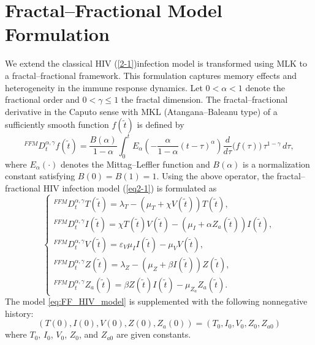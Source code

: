 \documentclass{article}
\theoremstyle{plain}
\theoremstyle{definition}
\numberwithin{equation}{section}
\begin{document}
\section{Fractal--Fractional Model Formulation}\label{sec4}
We extend the classical HIV (\ref{2-1})infection model is transformed using MLK to a fractal--fractional framework. This formulation captures memory effects and heterogeneity in the immune response dynamics.
Let $0<\alpha<1$ denote the fractional order and $0<\gamma\leq 1$ the fractal dimension. The fractal--fractional derivative in the Caputo sense with MKL (Atangana--Baleanu type) of a sufficiently smooth function $f(\tilde{t})$ is defined by
\begin{equation}
{}^{FFM}D_{t}^{\alpha,\gamma} f(\tilde{t})
=
\frac{B(\alpha)}{1-\alpha}
\int_{0}^{t}
E_{\alpha}\!\left(-\frac{\alpha}{1-\alpha}(t-\tau)^{\alpha}\right)
\frac{d}{d\tau}\big(f(\tau)\big)\,
\tau^{1-\gamma}\, d\tau,
\end{equation}
where $E_{\alpha}(\cdot)$ denotes the Mittag--Leffler function and $B(\alpha)$ is a normalization constant satisfying $B(0)=B(1)=1$.
Using the above operator, the fractal--fractional HIV infection model (\ref{eq2-1}) is formulated as
\begin{equation}
\label{eq:FF_HIV_model}
\begin{cases}
{}^{FFM}D_{t}^{\alpha,\gamma} T(\tilde{t})
= \lambda_T - (\mu_T + \chi V(\tilde{t}))T(\tilde{t}), \\[6pt]

{}^{FFM}D_{t}^{\alpha,\gamma} I(\tilde{t})
= \chi T(\tilde{t})V(\tilde{t}) - (\mu_I  + \alpha Z_{a}(\tilde{t}))I(\tilde{t}), \\[6pt]

{}^{FFM}D_{t}^{\alpha,\gamma} V(\tilde{t})
= \varepsilon_V \mu_I I(\tilde{t}) - \mu_V V(\tilde{t}), \\[6pt]

{}^{FFM}D_{t}^{\alpha,\gamma} Z(\tilde{t})
= \lambda_Z - (\mu_Z  + \beta  I(\tilde{t}))Z(\tilde{t}), \\[6pt]

{}^{FFM}D_{t}^{\alpha,\gamma} Z_{a}(\tilde{t})
= \beta Z(\tilde{t}) I(\tilde{t}) - \mu_{Z_a} Z_{a}(\tilde{t}).
\end{cases}
\end{equation}
The model \eqref{eq:FF_HIV_model} is supplemented with the following nonnegative history:
\begin{equation}\label{eq:initial}
(T(0),I(0),V(0),Z(0), Z_a(0) )=(T_0,I_0,V_0,Z_0,Z_{a0} )
\end{equation}
where $T_0$, $I_0$, $V_0$, $Z_0$, and $Z_{a0}$ are given constants.
\end{document}
